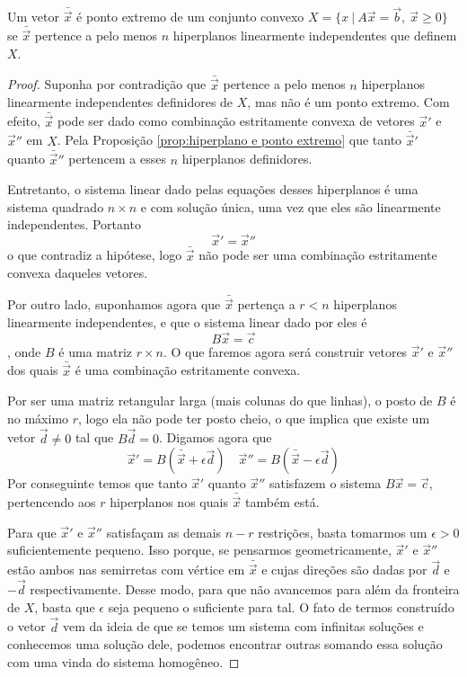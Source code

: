 \begin{thm:ponto extremo}
	Um vetor $\bar{\vec{x}}$ é ponto extremo de um conjunto convexo $X = \{x\ |\ A\vec{x} = \vec{b},\ \vec{x} \geq 0\}$ se $\bar{\vec{x}}$ pertence a pelo menos $n$ hiperplanos linearmente independentes que definem $X$.
	
	\begin{proof}
		Suponha por contradição que $\bar{\vec{x}}$ pertence a pelo menos $n$ hiperplanos linearmente independentes definidores de $X$, mas não é um ponto extremo. Com efeito, $\bar{\vec{x}}$ pode ser dado como combinação estritamente convexa de vetores $\vec{x}'$ e $\vec{x}''$ em $X$. Pela Proposição \ref{prop:hiperplano e ponto extremo} que tanto $\bar{\vec{x}}'$ quanto $\bar{\vec{x}}''$ pertencem a esses $n$ hiperplanos definidores.
		
		Entretanto, o sistema linear dado pelas equações desses hiperplanos é uma sistema quadrado $n \times n$ e com solução única, uma vez que eles são linearmente independentes. Portanto \[\vec{x}' = \vec{x}''\]o que contradiz a hipótese, logo $\bar{\vec{x}}$ não pode ser uma combinação estritamente convexa daqueles vetores.
		
		Por outro lado, suponhamos agora que $\bar{\vec{x}}$ pertença a $r < n$ hiperplanos linearmente independentes, e que o sistema linear dado por eles é \[B\vec{x} = \vec{c}\], onde $B$ é uma matriz $r \times n$. O que faremos agora será construir vetores $\vec{x}'$ e $\vec{x}''$ dos quais $\bar{\vec{x}}$ é uma combinação estritamente convexa.  
		
		Por ser uma matriz retangular larga (mais colunas do que linhas), o posto de $B$ é no máximo $r$, logo ela não pode ter posto cheio, o que implica que existe um vetor $\vec{d} \neq 0$ tal que $B \vec{d} = 0$. Digamos agora que
		\begin{equation*}
			\vec{x}' = B(\bar{\vec{x}} + \epsilon \vec{d})
			\quad
			\vec{x}'' = B(\bar{\vec{x}} - \epsilon \vec{d})
		\end{equation*}
		Por conseguinte temos que tanto $\vec{x}'$ quanto $\vec{x}''$ satisfazem o sistema $B\vec{x} = \vec{c}$, pertencendo aos $r$ hiperplanos nos quais $\bar{\vec{x}}$ também está. 
		
		Para que $\vec{x}'$ e $\vec{x}''$ satisfaçam as demais $n - r$ restrições, basta tomarmos um $\epsilon > 0$ suficientemente pequeno. Isso porque, se pensarmos geometricamente,  $\vec{x}'$ e $\vec{x}''$ estão ambos nas semirretas com vértice em $\bar{\vec{x}}$ e cujas direções são dadas por $\vec{d}$ e $-\vec{d}$ respectivamente. Desse modo, para que não avancemos para além da fronteira de $X$, basta que $\epsilon$ seja pequeno o suficiente para tal. O fato de termos construído o vetor $\vec{d}$ vem da ideia de que se temos um sistema com infinitas soluções e conhecemos uma solução dele, podemos encontrar outras somando essa solução com uma vinda do sistema homogêneo.
		

\end{proof}
\end{thm:ponto extremo}
